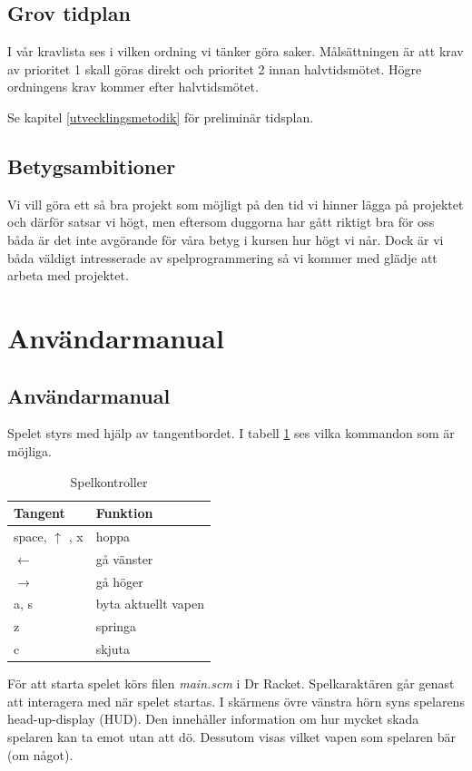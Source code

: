 \documentclass{scrartcl}
\begin{document}
\subsection{Grov tidplan}
I vår kravlista ses i vilken ordning vi tänker göra saker. Målsättningen är att krav av prioritet 1 skall göras direkt och prioritet 2 innan halvtidsmötet. Högre ordningens krav kommer efter halvtidsmötet.

Se kapitel \ref{utvecklingsmetodik} för preliminär tidsplan.

\subsection{Betygsambitioner}
Vi vill göra ett så bra projekt som möjligt på den tid vi hinner lägga på projektet och därför satsar vi högt, men eftersom duggorna har gått riktigt bra för oss båda är det inte avgörande för våra betyg i kursen hur högt vi når. Dock är vi båda väldigt intresserade av spelprogrammering så vi kommer med glädje att arbeta med projektet.

\section{Användarmanual}
\subsection{Användarmanual}

Spelet styrs med hjälp av tangentbordet. I tabell \ref{kontroller} ses vilka kommandon som är möjliga. 

\begin{table}[ht]
\caption{Spelkontroller}\label{kontroller}
\centering
    \begin{tabular}{ll}
    \toprule
    Tangent  & Funktion \\
    \midrule
    space, $\uparrow$ , x & hoppa \\
    $\leftarrow$  & gå vänster \\
    $\rightarrow$ & gå höger \\
    a, s     & byta aktuellt vapen \\
    z        & springa \\
    c        & skjuta \\
    \bottomrule
    \end{tabular}
\end{table}

För att starta spelet körs filen \textsl{main.scm} i Dr Racket. Spelkaraktären går genast att interagera med när spelet startas. I skärmens övre vänstra hörn syns spelarens head-up-display (HUD). Den innehåller information om hur mycket skada spelaren kan ta emot utan att dö. Dessutom visas vilket vapen som spelaren bär (om något). 
\end{document}
